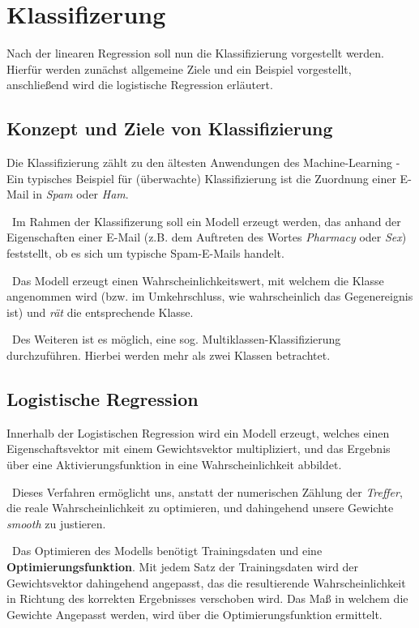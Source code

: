 \section{Klassifizerung}
\label{sec:Klassifizierung}
Nach der linearen Regression soll nun die Klassifizierung vorgestellt werden. Hierfür werden zunächst allgemeine Ziele und ein Beispiel vorgestellt, anschließend wird die logistische Regression erläutert. 
 
\subsection{Konzept und Ziele von Klassifizierung}
Die Klassifizierung zählt zu den ältesten Anwendungen des Machine-Learning - Ein typisches Beispiel für (überwachte) Klassifizierung ist die Zuordnung einer E-Mail in \textit{Spam} oder \textit{Ham}.

~\newline Im Rahmen der Klassifizerung soll ein Modell erzeugt werden, das anhand der Eigenschaften einer E-Mail (z.B. dem Auftreten des Wortes \textit{Pharmacy} oder \textit{Sex}) feststellt, ob es sich um typische Spam-E-Mails handelt. 

~\newline Das Modell erzeugt einen Wahrscheinlichkeitswert, mit welchem die Klasse angenommen wird (bzw. im Umkehrschluss, wie wahrscheinlich das Gegenereignis ist) und \textit{rät} die entsprechende Klasse. 

~\newline Des Weiteren ist es möglich, eine sog. Multiklassen-Klassifizierung durchzuführen. Hierbei werden mehr als zwei Klassen betrachtet. 
\subsection{Logistische Regression}
Innerhalb der Logistischen Regression wird ein Modell erzeugt, welches einen Eigenschaftsvektor mit einem Gewichtsvektor multipliziert, und das Ergebnis über eine Aktivierungsfunktion in eine Wahrscheinlichkeit abbildet. 

~\newline Dieses Verfahren ermöglicht uns, anstatt der numerischen Zählung der \textit{Treffer}, die reale Wahrscheinlichkeit zu optimieren, und dahingehend unsere Gewichte \textit{smooth} zu justieren. 

~\newline Das Optimieren des Modells benötigt Trainingsdaten und eine \textbf{Optimierungsfunktion}. Mit jedem Satz der Trainingsdaten wird der Gewichtsvektor dahingehend angepasst, das die resultierende Wahrscheinlichkeit in Richtung des korrekten Ergebnisses verschoben wird. Das Maß in welchem die Gewichte Angepasst werden, wird über die Optimierungsfunktion ermittelt. 

